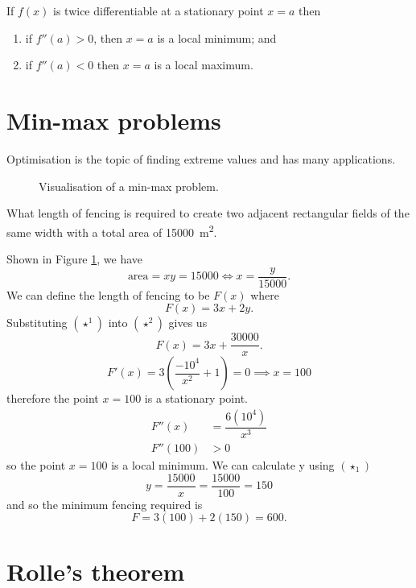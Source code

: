 If $f(x)$ is twice differentiable at a stationary point $x=a$ then
\begin{enumerate}
    \item if $f''(a)>0$, then $x=a$ is a local minimum; and
    \item if $f''(a)<0$ then $x=a$ is a local maximum.
\end{enumerate}

\section{Min-max problems}

Optimisation is the topic of finding extreme values and has many applications.

\begin{figure}
    \centering
    \caption{Visualisation of a min-max problem.}
    \label{fig:fencing_min_max}
\end{figure}

\begin{example}
    What length of fencing is required to create two adjacent rectangular fields of the same width with a total area of \SI{15000}{\meter\squared}.
    
    Shown in Figure \ref{fig:fencing_min_max}, we have \[\text{area}=xy=15000\iff x=\dfrac y{15000}\tag{$\star^1$}.\] We can define the length of fencing to be $F(x)$ where \[F(x)=3x+2y\tag{$\star^2$}.\] Substituting $(\star^1)$ into $(\star^2)$ gives us \[F(x)=3x+\dfrac{30000}x.\] \[F'(x)=3\left(\dfrac{-10^4}{x^2}+1\right)=0\implies x=100\] therefore the point $x=100$ is a stationary point. 
    \begin{align*}
        F''(x)&=\dfrac{6(10^4)}{x^3}\\
        F''(100)&>0
    \end{align*}
    so the point $x=100$ is a local minimum. We can calculate y using $(\star_1)$ \[y=\dfrac{15000}x=\dfrac{15000}{100}=150\] and so the minimum fencing required is \[F=3(100)+2(150)=600.\]
\end{example}

\section{Rolle's theorem}

